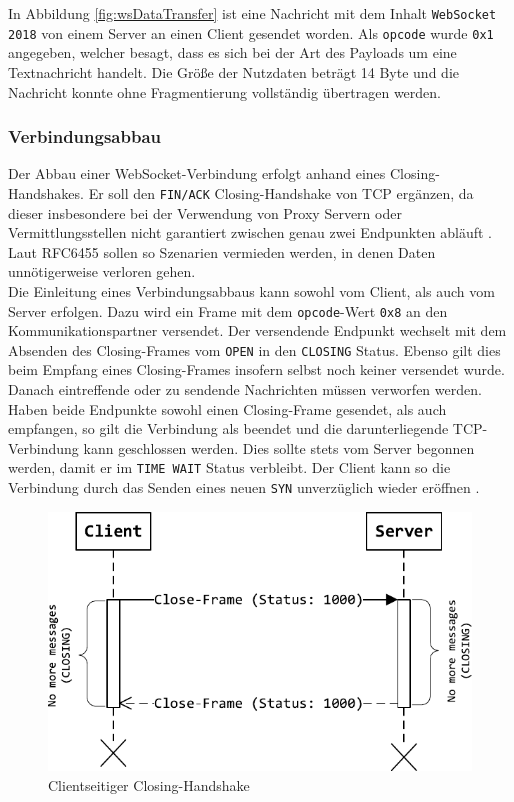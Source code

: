\documentclass[11pt,a4paper,titlepage]{scrartcl}
\numberwithin{equation}{section}
\begin{document}
\noindent In Abbildung \ref{fig:wsDataTransfer} ist eine Nachricht mit dem Inhalt \texttt{WebSocket 2018} von einem Server an einen Client gesendet worden. Als \texttt{opcode} wurde \texttt{0x1} angegeben, welcher besagt, dass es sich bei der Art des Payloads um eine Textnachricht handelt. Die Größe der Nutzdaten beträgt 14 Byte und die Nachricht konnte ohne Fragmentierung vollständig übertragen werden.

\subsubsection{Verbindungsabbau}\label{subsubsec:wsClose}
Der Abbau einer WebSocket-Verbindung erfolgt anhand eines Closing-Handshakes. Er soll den \texttt{FIN/ACK} Closing-Handshake von TCP ergänzen, da dieser insbesondere bei der Verwendung von Proxy Servern oder Vermittlungsstellen nicht garantiert zwischen genau zwei Endpunkten abläuft \autocite[9]{fette_websocket_2011}. Laut RFC6455 sollen so Szenarien vermieden werden, in denen Daten unnötigerweise verloren gehen. \\

\noindent Die Einleitung eines Verbindungsabbaus kann sowohl vom Client, als auch vom Server erfolgen. Dazu wird ein Frame mit dem \texttt{opcode}-Wert \texttt{0x8} an den Kommunikationspartner versendet. Der versendende Endpunkt wechselt mit dem Absenden des Closing-Frames vom \texttt{OPEN} in den \texttt{CLOSING} Status. Ebenso gilt dies beim Empfang eines Closing-Frames insofern selbst noch keiner versendet wurde. Danach eintreffende oder zu sendende Nachrichten müssen verworfen werden. Haben beide Endpunkte sowohl einen Closing-Frame gesendet, als auch empfangen, so gilt die Verbindung als beendet und die darunterliegende TCP-Verbindung kann geschlossen werden. Dies sollte stets vom Server begonnen werden, damit er im \texttt{TIME WAIT} Status verbleibt. Der Client kann so die Verbindung durch das Senden eines neuen \texttt{SYN} unverzüglich wieder eröffnen \autocite[41]{fette_websocket_2011}. \\

\begin{figure}[ht] 
	\begin{center}
		\includegraphics[scale=1]{img/closehandshake.pdf}
		\caption{Clientseitiger Closing-Handshake}
		\label{fig:wsClosingHandshake}
	\end{center}
\end{figure}
\end{document}
